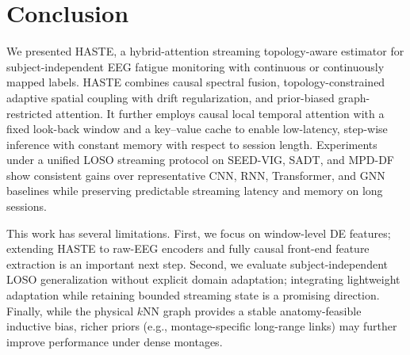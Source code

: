 \documentclass[preprint,12pt]{elsarticle}
\begin{document}
\section{Conclusion}
\label{sec:conclusion}

We presented HASTE, a hybrid-attention streaming topology-aware estimator for subject-independent EEG fatigue monitoring with continuous or continuously mapped labels. HASTE combines causal spectral fusion, topology-constrained adaptive spatial coupling with drift regularization, and prior-biased graph-restricted attention. It further employs causal local temporal attention with a fixed look-back window and a key--value cache to enable low-latency, step-wise inference with constant memory with respect to session length. Experiments under a unified LOSO streaming protocol on SEED-VIG, SADT, and MPD-DF show consistent gains over representative CNN, RNN, Transformer, and GNN baselines while preserving predictable streaming latency and memory on long sessions.

This work has several limitations. First, we focus on window-level DE features; extending HASTE to raw-EEG encoders and fully causal front-end feature extraction is an important next step. Second, we evaluate subject-independent LOSO generalization without explicit domain adaptation; integrating lightweight adaptation while retaining bounded streaming state is a promising direction. Finally, while the physical $k$NN graph provides a stable anatomy-feasible inductive bias, richer priors (e.g., montage-specific long-range links) may further improve performance under dense montages.
\newpage
 

\end{document}
